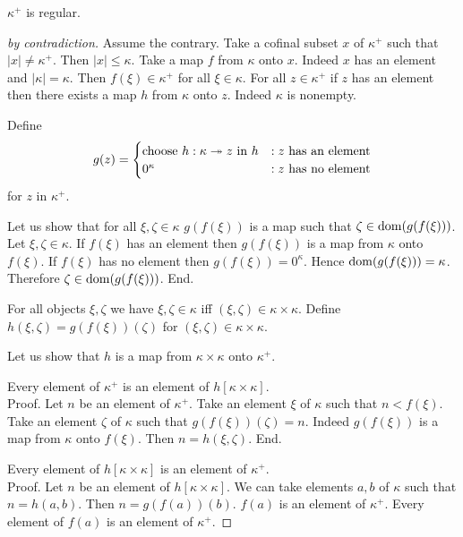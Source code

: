 \documentclass{article}
\begin{document}
  \begin{forthel}
    \begin{theorem*}[Hausdorff]
      $\kappa^{+}$ is regular.
    \end{theorem*}
    \begin{proof}[by contradiction]
      Assume the contrary.
      Take a cofinal subset $x$ of $\kappa^{+}$ such that $|x| \neq \kappa^{+}$.
      Then $|x| \leq \kappa$.
      Take a map $f$ from $\kappa$ onto $x$.
      Indeed $x$ has an element and $|\kappa| = \kappa$.
      Then $f(\xi) \in \kappa^{+}$ for all $\xi \in \kappa$.
      For all $z \in \kappa^{+}$ if $z$ has an element then there exists a map
      $h$ from $\kappa$ onto $z$.
      Indeed $\kappa$ is nonempty.

      Define \[ g(z) =
        \begin{cases}
          \text{choose $h : \kappa \twoheadrightarrow z$ in $h$}
          & : \text{$z$ has an element}
          \\
          \text{$0^{\kappa}$}
          & : \text{$z$ has no element}
        \end{cases}
      \] for $z$ in $\kappa^{+}$.

      Let us show that for all $\xi, \zeta \in \kappa$ $g(f(\xi))$ is a map such
      that $\zeta \in \operatorname{dom}(g(f(\xi)))$.
        Let $\xi, \zeta \in \kappa$.
        If $f(\xi)$ has an element then $g(f(\xi))$ is a map from $\kappa$ onto
        $f(\xi)$.
        If $f(\xi)$ has no element then $g(f(\xi)) = 0^{\kappa}$.
        Hence $\operatorname{dom}(g(f(\xi))) = \kappa$.
        Therefore $\zeta \in \operatorname{dom}(g(f(\xi)))$.
      End.

      For all objects $\xi, \zeta$ we have $\xi, \zeta \in \kappa$ iff
      $(\xi, \zeta) \in \kappa \times \kappa$.
      Define $h(\xi,\zeta) = g(f(\xi))(\zeta)$ for $(\xi,\zeta) \in \kappa
      \times \kappa$.

      Let us show that $h$ is a map from $\kappa \times \kappa$ onto
      $\kappa^{+}$.

        Every element of $\kappa^{+}$ is an element of $h[\kappa \times
        \kappa]$. \\
        Proof.
          Let $n$ be an element of $\kappa^{+}$.
          Take an element $\xi$ of $\kappa$ such that $n < f(\xi)$.
          Take an element $\zeta$ of $\kappa$ such that $g(f(\xi))(\zeta) = n$.
          Indeed $g(f(\xi))$ is a map from $\kappa$ onto $f(\xi)$.
          Then $n = h(\xi,\zeta)$.
        End.

        Every element of $h[\kappa \times \kappa]$ is an element of
        $\kappa^{+}$. \\
        Proof.
          Let $n$ be an element of $h[\kappa \times \kappa]$.
          We can take elements $a, b$ of $\kappa$ such that $n = h(a,b)$.
          Then $n = g(f(a))(b)$.
          $f(a)$ is an element of $\kappa^{+}$.
          Every element of $f(a)$ is an element of $\kappa^{+}$.


\end{proof}
\end{forthel}
\end{document}
